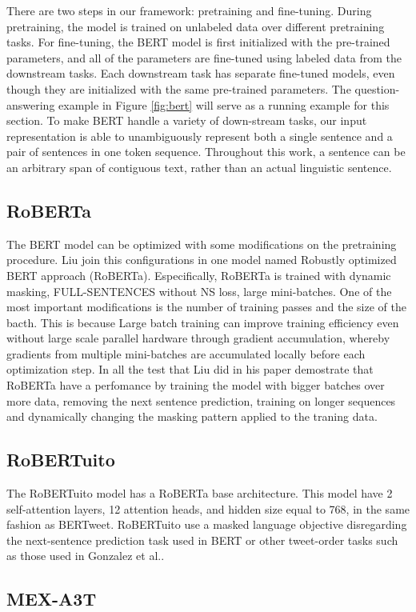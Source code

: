 There are two steps in our framework: pretraining and fine-tuning. During pretraining, the model is trained on unlabeled data over different pretraining tasks. For fine-tuning, the BERT model is first initialized with the pre-trained parameters, and all of the parameters are fine-tuned using labeled data from the downstream tasks. Each downstream task has separate fine-tuned models, even though they are initialized with the same pre-trained parameters. The question-answering example in Figure \ref{fig:bert} will serve as a running example for this section. To make BERT handle a variety of down-stream tasks, our input representation is able to unambiguously represent both a single sentence and a pair of sentences in one token sequence. Throughout this work, a sentence can be an arbitrary span of contiguous text, rather than an actual linguistic sentence.

\subsection{RoBERTa}

The BERT model can be optimized with some modifications on the pretraining procedure. Liu\cite{Liu_2019} join this configurations in one model named Robustly optimized BERT approach (RoBERTa). Especifically, RoBERTa is trained with dynamic masking, FULL-SENTENCES without NS loss, large mini-batches. One of the most important modifications is the number of training passes and the size of the bacth. This is because Large batch training can improve training efficiency even without large scale parallel hardware through gradient accumulation, whereby gradients from multiple mini-batches are accumulated locally before each optimization step\cite{Ott_2019}. In all the test that Liu\cite{Liu_2019} did in his paper demostrate that RoBERTa have a perfomance by training the model with bigger batches over more data, removing the next sentence prediction, training on longer sequences and dynamically changing the masking pattern applied to the traning data.

\subsection{RoBERTuito}

The RoBERTuito model has a RoBERTa base architecture. This model have 2 self-attention layers, 12 attention heads, and hidden size equal to 768, in the same fashion as BERTweet\cite{Nguyen_2020}. RoBERTuito use a masked language objective disregarding the next-sentence prediction task used in BERT or other tweet-order tasks such as those used in Gonzalez et al.\cite{Gonzalez_2021}.

\subsection{MEX-A3T}


